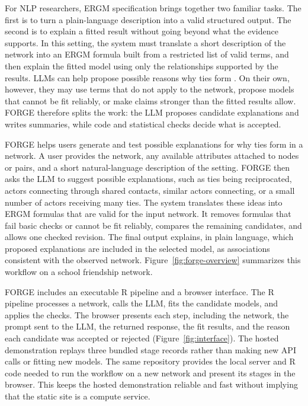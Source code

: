 \documentclass[11pt]{article}
\begin{document}
For NLP researchers, ERGM specification brings together two familiar tasks. The first is to turn a plain-language description into a valid structured output. The second is to explain a fitted result without going beyond what the evidence supports. In this setting, the system must translate a short description of the network into an ERGM formula built from a restricted list of valid terms, and then explain the fitted model using only the relationships supported by the results. LLMs can help propose possible reasons why ties form \citep{yao2023react,schick2023toolformer}. On their own, however, they may use terms that do not apply to the network, propose models that cannot be fit reliably, or make claims stronger than the fitted results allow. FORGE therefore splits the work: the LLM proposes candidate explanations and writes summaries, while code and statistical checks decide what is accepted.

FORGE helps users generate and test possible explanations for why ties form in a network. A user provides the network, any available attributes attached to nodes or pairs, and a short natural-language description of the setting. FORGE then asks the LLM to suggest possible explanations, such as ties being reciprocated, actors connecting through shared contacts, similar actors connecting, or a small number of actors receiving many ties. The system translates these ideas into ERGM formulas that are valid for the input network. It removes formulas that fail basic checks or cannot be fit reliably, compares the remaining candidates, and allows one checked revision. The final output explains, in plain language, which proposed explanations are included in the selected model, as associations consistent with the observed network. Figure~\ref{fig:forge-overview} summarizes this workflow on a school friendship network.

FORGE includes an executable R pipeline and a browser interface. The R pipeline processes a network, calls the LLM, fits the candidate models, and applies the checks. The browser presents each step, including the network, the prompt sent to the LLM, the returned response, the fit results, and the reason each candidate was accepted or rejected (Figure~\ref{fig:interface}). The hosted demonstration replays three bundled stage records rather than making new API calls or fitting new models. The same repository provides the local server and R code needed to run the workflow on a new network and present its stages in the browser. This keeps the hosted demonstration reliable and fast without implying that the static site is a compute service.
\end{document}
